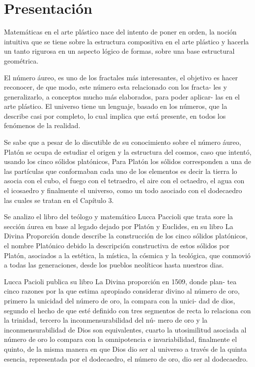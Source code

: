 \documentclass[12pt,a4paper]{book}
\begin{document}
\renewcommand\listtablename{Lista de tablas}
\listoftables

\chapter*{Presentación}


Matemáticas en el arte plástico nace del intento de poner en orden, la  noción intuitiva que se tiene sobre la estructura compositiva en el arte plástico y hacerla un tanto rigurosa en un aspecto lógico de formas, sobre una
base estructural geométrica.

El número áureo, es uno de los fractales más interesantes, el objetivo es
hacer reconocer, de que modo, este número esta relacionado con los fracta-
les y generalizarlo, a conceptos mucho más elaborados, para poder aplicar-
las en el arte plástico. El universo tiene un lenguaje, basado en los números,
que la describe casi por completo, lo cual implica que está presente, en todos
los fenómenos de la realidad.

Se sabe que a pesar de lo discutible de su conocimiento sobre el número
áureo, Platón se ocupa de estudiar el origen y la estructura del cosmos,
caso que intentó, usando los cinco sólidos platónicos, Para Platón los sólidos
corresponden a una de las partículas que conformaban cada uno de los
elementos es decir la tierra lo asocia con el cubo, el fuego con el tetraedro,
el aire con el octaedro, el agua con el icosaedro y finalmente el universo,
como un todo asociado con el dodecaedro las cuales se tratan en el Capítulo 3.

Se analizo el libro del teólogo y matemático Lucca Paccioli que trata
sore la sección áurea en base al legado dejado por Platón y Euclides, en
su libro La Divina Proporción donde describe la construcción de los cinco
sólidos platónicos, el nombre Platónico debido la descripción constructiva
de estos sólidos por Platón, asociados a la estética, la mística, la cósmica
y la teológica, que conmovió a todas las generaciones, desde los pueblos
neolíticos hasta nuestros dias.

Lucca Pacioli publica su libro La Divina proporción en 1509, donde plan-
tea cinco razones por la que estima apropiado considerar divino al número
de oro, primero la unicidad del número de oro, la compara con la unici-
dad de dios, segundo el hecho de que esté definido con tres segmentos de
recta lo relaciona con la trinidad, tercero la inconmensurabilidad del nú-
mero de oro y la inconmensurabilidad de Dios son equivalentes, cuarto la
utosimilitud asociada al número de oro lo compara con la omnipotencia e
invariabilidad, finalmente el quinto, de la misma manera en que Dios dio ser
al universo a través de la quinta esencia, representada por el dodecaedro,
el número de oro, dio ser al dodecaedro.
\end{document}
